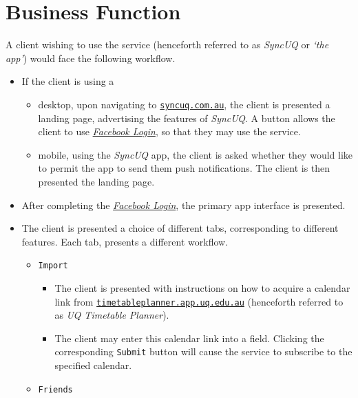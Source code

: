 \documentclass[11pt,a4paper]{report}
\begin{document}
\section{Business Function}

A client wishing to use the service (henceforth referred to as \textit{SyncUQ} or \textit{`the app'}) would face the following workflow.

\begin{itemize}
    \item If the client is using a 
        \begin{itemize} 
            \item desktop, upon navigating to \href{http://www.syncuq.com.au/}{\texttt{syncuq.com.au}}, the client is presented a landing page, advertising the features of \textit{SyncUQ}. A button allows the client to use \href{https://developers.facebook.com/docs/facebook-login}{\textit{Facebook Login}}, so that they may use the service.
            \item mobile, using the \textit{SyncUQ} app, the client is asked whether they would like to permit the app to send them push notifications. The client is then presented the landing page.
        \end{itemize}
    \item After completing the \href{https://developers.facebook.com/docs/facebook-login}{\textit{Facebook Login}}, the primary app interface is presented.
    \item The client is presented a choice of different tabs, corresponding to different features. Each tab, presents a different workflow.
        \begin{itemize}
            \item \texttt{Import}
                \begin{itemize}
                    \item The client is presented with instructions on how to acquire a calendar link from \href{http://timetableplanner.app.uq.edu.au/}{\texttt{timetableplanner.app.uq.edu.au}} (henceforth referred to as \textit{UQ Timetable Planner}).
                    \item The client may enter this calendar link into a field. Clicking the corresponding \texttt{Submit} button will cause the service to subscribe to the specified calendar.
                \end{itemize}
            \item \texttt{Friends}

\end{itemize}
\end{itemize}
\end{document}
